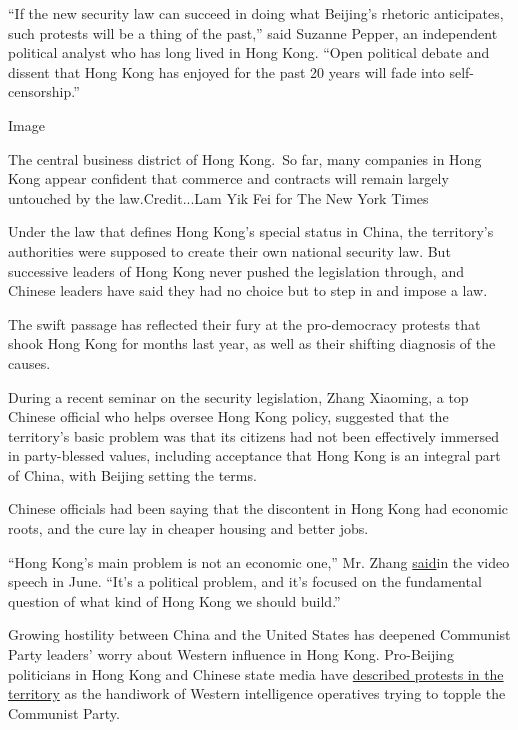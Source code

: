 ``If the new security law can succeed in doing what Beijing's rhetoric
anticipates, such protests will be a thing of the past,'' said Suzanne
Pepper, an independent political analyst who has long lived in Hong
Kong. ``Open political debate and dissent that Hong Kong has enjoyed for
the past 20 years will fade into self-censorship.''

Image

The central business district of Hong Kong.~So far, many companies in
Hong Kong appear confident that commerce and contracts will remain
largely untouched by the law.Credit...Lam Yik Fei for The New York Times

Under the law that defines Hong Kong's special status in China, the
territory's authorities were supposed to create their own national
security law. But successive leaders of Hong Kong never pushed the
legislation through, and Chinese leaders have said they had no choice
but to step in and impose a law.

The swift passage has reflected their fury at the pro-democracy protests
that shook Hong Kong for months last year, as well as their shifting
diagnosis of the causes.

During a recent seminar on the security legislation, Zhang Xiaoming, a
top Chinese official who helps oversee Hong Kong policy, suggested that
the territory's basic problem was that its citizens had not been
effectively immersed in party-blessed values, including acceptance that
Hong Kong is an integral part of China, with Beijing setting the terms.

Chinese officials had been saying that the discontent in Hong Kong had
economic roots, and the cure lay in cheaper housing and better jobs.

``Hong Kong's main problem is not an economic one,'' Mr. Zhang
\href{https://www.hmo.gov.cn/gab/bld/zxm/gzdt/202006/t20200608_21923.html}{said}in
the video speech in June. ``It's a political problem, and it's focused
on the fundamental question of what kind of Hong Kong we should build.''

Growing hostility between China and the United States has deepened
Communist Party leaders' worry about Western influence in Hong Kong.
Pro-Beijing politicians in Hong Kong and Chinese state media have
\href{https://www.nytimes3xbfgragh.onion/2014/10/31/world/asia/dan-garrett-hong-kong-protests.html}{described
protests in the territory} as the handiwork of Western intelligence
operatives trying to topple the Communist Party.

